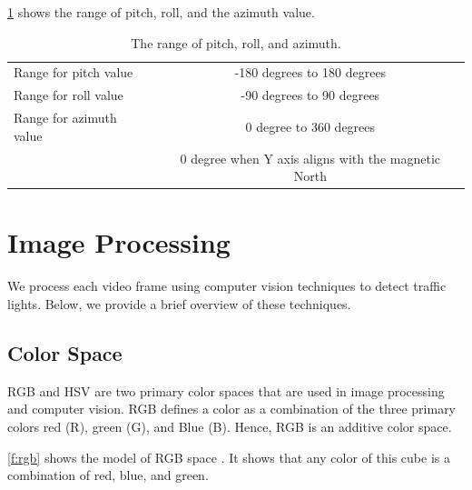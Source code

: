 \ref{t:rpy} shows the range of pitch, roll, and the azimuth value.
\begin{table}[h!]
  \centering
  \caption{The range of pitch, roll, and azimuth.}
  \label{t:rpy}
  \begin{tabular}{  l   c  }
    \rowcolor{gray!50}
    \hline
    Range for pitch value & -180 degrees to 180 degrees \\
    Range for roll value & -90 degrees to 90 degrees  \\
    Range for azimuth value & 0 degree to 360 degrees \\
    \rowcolor{gray!50}
    & 0 degree when Y axis aligns with the magnetic North \\
    
  \end{tabular}
\end{table}


\section {Image Processing}
We process each video frame using computer vision techniques to detect traffic lights. 
Below, we provide a brief overview of these techniques. 

\subsection{Color Space}
\label{s:color_space}
RGB \cite{rgb} and HSV \cite{hsv} are two primary color spaces that are used in image processing and computer vision.
RGB defines a color as a combination of the three primary colors red (R), green (G), and Blue (B).
Hence, RGB is an additive color space.

\ref{f:rgb} shows the model of RGB space \cite{rgb}.
It shows that any color of this cube is a combination of red, blue, and green.

